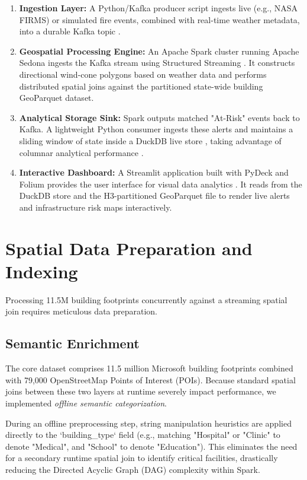 \documentclass[acmsmall,screen,nonacm]{acmart}
\begin{document}
\begin{enumerate}
    \item \textbf{Ingestion Layer:} A Python/Kafka producer script ingests live (e.g., NASA FIRMS) or simulated fire events, combined with real-time weather metadata, into a durable Kafka topic \cite{wang2015kafka, narkhede2017kafka}.
    \item \textbf{Geospatial Processing Engine:} An Apache Spark cluster running Apache Sedona \cite{yu2015geospark} ingests the Kafka stream using Structured Streaming \cite{armbrust2018structured}. It constructs directional wind-cone polygons based on weather data and performs distributed spatial joins against the partitioned state-wide building GeoParquet dataset.
    \item \textbf{Analytical Storage Sink:} Spark outputs matched "At-Risk" events back to Kafka. A lightweight Python consumer ingests these alerts and maintains a sliding window of state inside a DuckDB live store \cite{raasveldt2019duckdb}, taking advantage of columnar analytical performance \cite{abadi2008column}.
    \item \textbf{Interactive Dashboard:} A Streamlit application built with PyDeck and Folium provides the user interface for visual data analytics \cite{keim2008visual}. It reads from the DuckDB store and the H3-partitioned \cite{brodsky2018h3, sahr2003geodesic} GeoParquet file to render live alerts and infrastructure risk maps interactively.
\end{enumerate}

\section{Spatial Data Preparation and Indexing}
Processing 11.5M building footprints concurrently against a streaming spatial join requires meticulous data preparation.

\subsection{Semantic Enrichment}
The core dataset comprises 11.5 million Microsoft building footprints combined with 79,000 OpenStreetMap Points of Interest (POIs). Because standard spatial joins between these two layers at runtime severely impact performance, we implemented \textit{offline semantic categorization}. 

During an offline preprocessing step, string manipulation heuristics are applied directly to the `building\_type` field (e.g., matching "Hospital" or "Clinic" to denote "Medical", and "School" to denote "Education"). This eliminates the need for a secondary runtime spatial join to identify critical facilities, drastically reducing the Directed Acyclic Graph (DAG) complexity within Spark.
\end{document}
